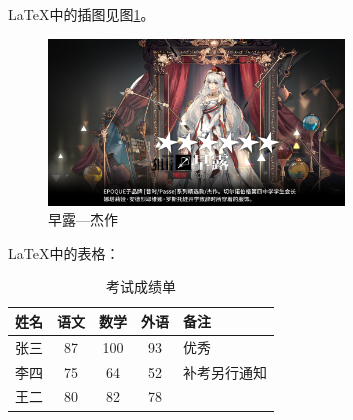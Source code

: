 \documentclass{ctexart}
\begin{document}
	\LaTeX{}中的插图见图\ref{poca}。	%
	\begin{figure}[htbp]	%
		\centering	%
		\includegraphics[scale=0.5,width=0.7\textwidth]{Poca}
		\caption{早露—杰作}\label{poca}	%
	\end{figure}

	
	\LaTeX{}中的表格：
	\begin{table}[h]	%
		\centering	%
		\caption{考试成绩单}
		\begin{tabular}{l || c | c | c | p{1.5cm}}	
		\hline	%
		姓名 & 语文 & 数学 & 外语 & 备注 \\
		\hline \hline
		张三 & 87	& 100 & 93 & 优秀 \\
		\hline
		李四 & 75 & 64 & 52 & 补考另行通知 \\
		\hline
		王二 & 80 & 82 & 78 & \\
		\hline
		\end{tabular}
	\end{table}
\end{document}

